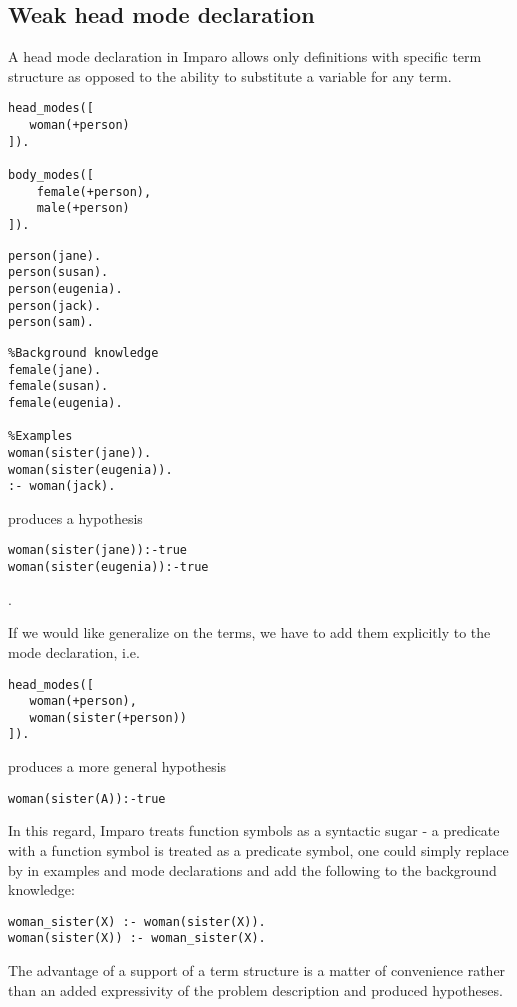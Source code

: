 \subsection{Weak head mode declaration}
A head mode declaration in Imparo allows only definitions with specific term structure as opposed to the ability to substitute a variable for any term.

\begin{minipage}[t]{.30\textwidth}
\begin{lstlisting}
head_modes([
   woman(+person)
]).

body_modes([
    female(+person),
    male(+person)
]).
\end{lstlisting}
\end{minipage}
\begin{minipage}[t]{.25\textwidth}
\begin{lstlisting}
person(jane).
person(susan).
person(eugenia).
person(jack).
person(sam).
\end{lstlisting}
\end{minipage}
\begin{minipage}[t]{.30\textwidth}
\begin{lstlisting}
%Background knowledge
female(jane).
female(susan).
female(eugenia).

%Examples
woman(sister(jane)).
woman(sister(eugenia)).
:- woman(jack).
\end{lstlisting}
\end{minipage}

produces a hypothesis 
\begin{lstlisting}
woman(sister(jane)):-true
woman(sister(eugenia)):-true
\end{lstlisting}.

If we would like generalize on the terms, we have to add them explicitly to the mode declaration, i.e.
\begin{lstlisting}
head_modes([
   woman(+person),
   woman(sister(+person))
]).
\end{lstlisting}
produces a more general hypothesis
\begin{lstlisting}
woman(sister(A)):-true
\end{lstlisting}

In this regard, Imparo treats function symbols as a syntactic sugar - a predicate with a function symbol is treated as a predicate symbol, one could simply replace  by  in examples and mode declarations and add the following to the background knowledge:
\begin{lstlisting}
woman_sister(X) :- woman(sister(X)).
woman(sister(X)) :- woman_sister(X).
\end{lstlisting}
The advantage of a support of a term structure is a matter of convenience rather than an added expressivity of the problem description and produced hypotheses.

